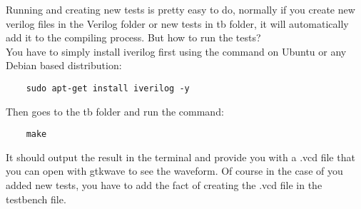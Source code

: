 Running and creating new tests is pretty easy to do, normally if you create new verilog files in the Verilog folder or new tests in
tb folder, it will automatically add it to the compiling process. But how to run the tests? \\

You have to simply install iverilog first using the command on Ubuntu or any Debian based distribution:
\begin{verbatim}
    sudo apt-get install iverilog -y
\end{verbatim}

Then goes to the tb folder and run the command:
\begin{verbatim}
    make
\end{verbatim}

It should output the result in the terminal and provide you with a .vcd file that you can open with gtkwave to see the waveform. 
Of course in the case of you added new tests, you have to add the fact of creating the .vcd file in the testbench file. \\